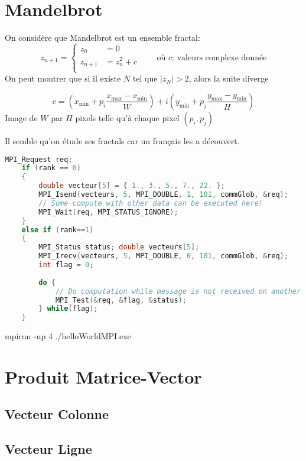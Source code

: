 \documentclass{article}
\begin{document}
\section{Mandelbrot}
\begin{resolution}
    On considère que Mandelbrot est un ensemble fractal:
    \begin{equation}
        z_{n+1} = 
        \begin{cases}
            z_{0}   &= 0\\
            z_{n+1} &= z_{n}^{2} + c\\
        \end{cases}
        \qquad\text{où $c$: valeurs complexe donnée}
    \end{equation}
    On peut montrer que si il existe $N$ tel que $|z_N|>2$, alors la suite diverge

    \begin{equation}
        c = (x_{\min} + p_{i}\frac{x_{\max} - x_{\min}}{W}) + i(y_{\min} + p_{j}\frac{y_{\max} - y_{\min}}{H})
    \end{equation}
    Image de $W$ par $H$ pixels telle qu'à chaque pixel $(p_{i}, p_{j})$

    Il semble qu'on étude ses fractals car un français les a découvert.
    \begin{scriptsize}
        \mycode
        \begin{lstlisting}[language=C++]
    MPI_Request req;
    if (rank == 0)
    {
        double vecteur[5] = { 1., 3., 5., 7., 22. };
        MPI_Isend(vecteurs, 5, MPI_DOUBLE, 1, 101, commGlob, &req);
        // Some compute with other data can be executed here!
        MPI_Wait(req, MPI_STATUS_IGNORE);
    }
    else if (rank==1)
    {
        MPI_Status status; double vecteurs[5];
        MPI_Irecv(vecteurs, 5, MPI_DOUBLE, 0, 101, commGlob, &req);
        int flag = 0;
        
        do {
            // Do computation while message is not received on another data
            MPI_Test(&req, &flag, &status);
        } while(flag);
    }
        \end{lstlisting}
    \end{scriptsize}
    mpirun -np 4 ./helloWorldMPI.exe
\end{resolution}

\section{Produit Matrice-Vector}
\subsection{Vecteur Colonne}
\begin{resolution}
    
\end{resolution}

\subsection{Vecteur Ligne}
\begin{resolution}
    
\end{resolution}
\end{document}

